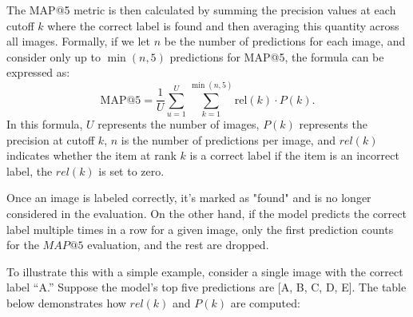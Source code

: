 \documentclass[twocolumn]{article}
\begin{document}
The MAP@5 metric is then calculated by summing the precision values at each cutoff \( k \) where the correct label is found and then averaging this quantity across all images. Formally, if we let \( n \) be the number of predictions for each image, and consider only up to \( \min(n, 5) \) predictions for MAP@5, the formula can be expressed as:
\begin{equation}
\text{MAP@5} = \frac{1}{U} \sum_{u=1}^{U} \sum_{k=1}^{\min(n, 5)} \text{rel}(k) \cdot P(k).
\end{equation}
In this formula, \(U\) represents the number of images, \(P(k)\) represents the precision at cutoff \(k\), \(n\) is the number of predictions per image, and \(rel(k)\) indicates whether the item at rank \(k\) is a correct label if the item is an incorrect label, the \(rel(k)\) is set to zero.

Once an image is labeled correctly, it's marked as "found" and is no longer considered in the evaluation. On the other hand, if the model predicts the correct label multiple times in a row for a given image, only the first prediction counts for the \(MAP@5\) evaluation, and the rest are dropped.

To illustrate this with a simple example, consider a single image with the correct label “A.” Suppose the model’s top five predictions are [A, B, C, D, E]. The table below demonstrates how \( rel(k) \) and \( P(k) \) are computed:

\begin{table}[ht!]
\centering
\renewcommand{\arraystretch}{1.5} %
\caption{Example computation of \( rel(k) \) and \( P(k) \) for an image with the correct label “A.” The first prediction is correct, so \( rel(k) \) is 1 for \( k = 1 \), and subsequent predictions contribute 0.}
\label{tab:map5_example}
\end{table}
\end{document}
